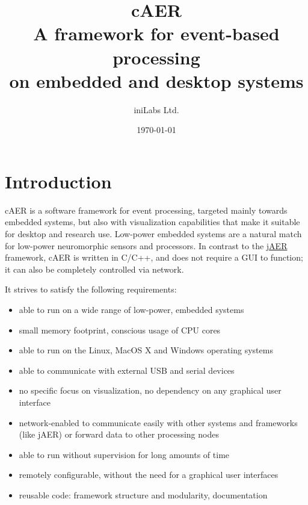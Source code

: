 \documentclass[a4paper,12pt]{report}
\begin{document}
\title{\textbf{cAER}\\A framework for event-based processing\\on embedded and desktop systems}

\author{iniLabs Ltd.}

\date{\today}

\maketitle

\tableofcontents{}

\chapter{Introduction} \label{chap:introduction}

cAER is a software framework for event processing, targeted mainly towards embedded systems, but also with visualization capabilities that make it suitable for desktop and research use.
Low-power embedded systems are a natural match for low-power neuromorphic sensors and processors.
In contrast to the \href{https://github.com/SensorsINI/jaer}{jAER} framework, cAER is written in C/C++, and does not require a GUI to function; it can also be completely controlled via network.

It strives to satisfy the following requirements:
\begin{itemize}
\item able to run on a wide range of low-power, embedded systems
\item small memory footprint, conscious usage of CPU cores
\item able to run on the Linux, MacOS X and Windows operating systems
\item able to communicate with external USB and serial devices
\item no specific focus on visualization, no dependency on any graphical user interface
\item network-enabled to communicate easily with other systems and frameworks (like jAER) or forward data to other processing nodes
\item able to run without supervision for long amounts of time
\item remotely configurable, without the need for a graphical user interfaces
\item reusable code: framework structure and modularity, documentation
\end{itemize}
\end{document}
